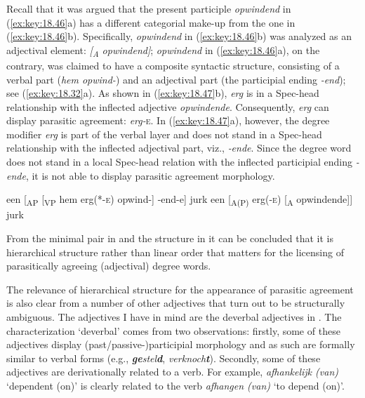 \documentclass[output=paper]{langsci/langscibook}
\begin{document}
Recall that it was argued that the present participle \emph{opwindend} in
(\ref{ex:key:18.46}a) has a different categorial make-up from the one in
(\ref{ex:key:18.46}b). Specifically, \emph{opwindend} in (\ref{ex:key:18.46}b) was
analyzed as an adjectival element: \emph{[\textsubscript{A} opwindend]};
\emph{opwindend} in (\ref{ex:key:18.46}a), on the contrary, was claimed to have a
composite syntactic structure, consisting of a verbal part (\emph{hem opwind-})
and an adjectival part (the participial ending \emph{-end}); see
(\ref{ex:key:18.32}a). As shown in (\ref{ex:key:18.47}b), \emph{erg} is in a Spec-head
relationship with the inflected adjective \emph{opwindende}. Consequently,
\emph{erg} can display parasitic agreement: \emph{erg-}\textsc{e}. In
(\ref{ex:key:18.47}a), however, the degree modifier \emph{erg} is part of the verbal
layer and does not stand in a Spec-head relationship with the inflected
adjectival part, viz., \emph{‑ende}. Since the degree word
does not stand in a local Spec-head relation with the inflected participial
ending \emph{-ende}, it is not able to display parasitic
agreement morphology.

\ea%
    \label{ex:key:18.47}
	\ea een [\textsubscript{AP} [\textsubscript{VP} hem erg(*-\textsc{e}) opwind-] -end-e] jurk
	\ex een [\textsubscript{A(P)} erg(\textsc{-e}) [\textsubscript{A} opwindende]] jurk
	\z
\z

From the minimal pair in  and the structure in 
it can be concluded that it is hierarchical structure rather than linear order
that matters for the licensing of parasitically agreeing (adjectival) degree
words.

The relevance of hierarchical structure for the appearance of parasitic
agreement is also clear from a number of other adjectives that turn out to be
structurally ambiguous. The adjectives I have in mind are the deverbal
adjectives in . The characterization \enquote*{deverbal} comes
from two observations: firstly, some of these adjectives display
(past/passive-)participial morphology and as such are formally similar to
verbal forms (e.g., \emph{\textbf{ge}stel\textbf{d}},
\emph{verknoch\textbf{t}}). Secondly, some of these adjectives are
derivationally related to a verb. For example, \emph{afhankelijk (van)}
\enquote*{dependent (on)} is clearly related to the verb \emph{afhangen (van)}
\enquote*{to depend (on)}.\newpage
\end{document}
